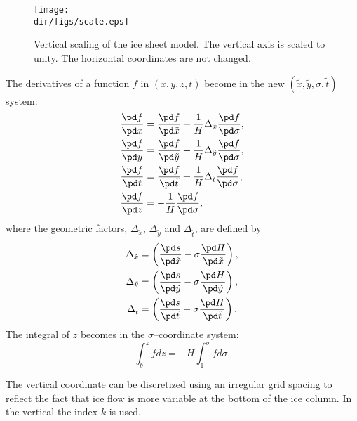 \begin{figure}[htbp]
  \begin{center}
    \texttt{[image: \\dir/figs/scale.eps]}
    \caption[Vertical scaling of the ice sheet model.]{Vertical scaling of the ice sheet model. The vertical axis is scaled to unity. The horizontal coordinates are not changed.}
    \label{kin.fig.scale}
  \end{center}
\end{figure}


The derivatives of a function $f$ in $(x,y,z,t)$ become in the new $(\tilde{x},\tilde{y},\sigma,\tilde{t})$ system:
\begin{subequations}
  \begin{align}
    \frac{\pd f}{\pd x} &= \frac{\pd f}{\pd\tilde{x}}+\frac1H\Delta_{\tilde{x}}\frac{\pd f}{\pd \sigma},\\
    \frac{\pd f}{\pd y} &= \frac{\pd f}{\pd\tilde{y}}+\frac1H\Delta_{\tilde{y}}\frac{\pd f}{\pd \sigma},\\
    \frac{\pd f}{\pd t} &= \frac{\pd f}{\pd\tilde{t}}+\frac1H\Delta_{\tilde{t}}\frac{\pd f}{\pd \sigma},\\
    \frac{\pd f}{\pd z} &= -\frac1H\frac{\pd f}{\pd\sigma},
  \end{align}
\end{subequations}
where  the geometric factors, $\Delta_{\tilde{x}}$, $\Delta_{\tilde{y}}$ and $\Delta_{\tilde{t}}$, are defined by
\begin{subequations}
  \begin{align}
  \Delta_{\tilde{x}}&=\left(\frac{\pd s}{\pd\tilde{x}}-\sigma\frac{\pd H}{\pd\tilde{x}}\right),\\
  \Delta_{\tilde{y}}&=\left(\frac{\pd s}{\pd\tilde{y}}-\sigma\frac{\pd H}{\pd\tilde{y}}\right),\\
  \Delta_{\tilde{t}}&=\left(\frac{\pd s}{\pd\tilde{t}}-\sigma\frac{\pd H}{\pd\tilde{t}}\right).
  \end{align}
\end{subequations}
The integral of $z$ becomes in the $\sigma$--coordinate system:
\begin{equation}
  \int_b^zfdz=-H\int_1^\sigma fd\sigma.
\end{equation}

The vertical coordinate can be discretized using an irregular grid spacing to reflect the fact that ice flow is more variable at the bottom of the ice column. In the vertical the index $k$ is used. 
